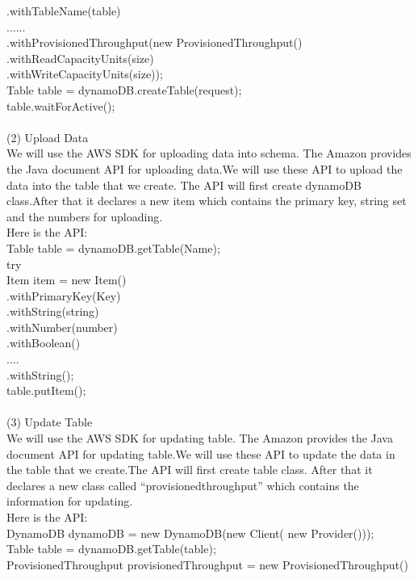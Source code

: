 .withTableName(table)\\
......\\
.withProvisionedThroughput(new ProvisionedThroughput()\\
            .withReadCapacityUnits(size)\\
            .withWriteCapacityUnits(size));\\
    Table table = dynamoDB.createTable(request);\\
    table.waitForActive();\\
\\
    (2) Upload Data\\
    We will use the AWS SDK for uploading data into schema. The Amazon provides the Java document API for uploading data.We will use these API to upload the data into the table that we create. The API will first create dynamoDB class.After that it declares a new item which contains the primary key, string set and the numbers for uploading.\\
    Here is the API\cite{w1}:\\
    Table table = dynamoDB.getTable(Name);\\
    try \\
    Item item = new Item()\\
                 .withPrimaryKey(Key)\\
                 .withString(string)\\
                 .withNumber(number)\\
                 .withBoolean()\\
                 ....\\
                 .withString();\\
    table.putItem();\\
\\
    (3) Update Table\\
    We will use the AWS SDK for updating table. The Amazon provides the Java document API for updating table.We will use these API to update the data in the table that we create.The API will first create table class. After that it declares a new class called “provisionedthroughput” which contains the information for updating.\\
    Here is the API\cite{w1}:\\
    DynamoDB dynamoDB = new DynamoDB(new Client(
    new Provider()));\\
    Table table = dynamoDB.getTable(table);\\
    ProvisionedThroughput provisionedThroughput = new ProvisionedThroughput()
